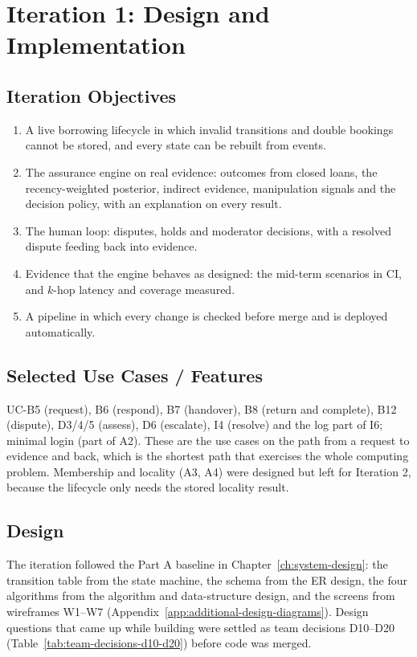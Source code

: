 \chapter{Iteration 1: Design and Implementation}\label{ch:iteration-1-design}
\section{Iteration Objectives}\label{sec:iteration-objectives}
\begin{enumerate}
\item A live borrowing lifecycle in which invalid transitions and double bookings cannot be stored, and every state can be rebuilt from events.
\item The assurance engine on real evidence: outcomes from closed loans, the recency-weighted posterior, indirect evidence, manipulation signals and the decision policy, with an explanation on every result.
\item The human loop: disputes, holds and moderator decisions, with a resolved dispute feeding back into evidence.
\item Evidence that the engine behaves as designed: the mid-term scenarios in CI, and $k$-hop latency and coverage measured.
\item A pipeline in which every change is checked before merge and  is deployed automatically.
\end{enumerate}

\section{Selected Use Cases / Features}\label{sec:selected-use-cases-features}
UC-B5 (request), B6 (respond), B7 (handover), B8 (return and complete), B12 (dispute), D3/4/5 (assess), D6 (escalate), I4 (resolve) and the log part of I6; minimal login (part of A2). These are the use cases on the path from a request to evidence and back, which is the shortest path that exercises the whole computing problem. Membership and locality (A3, A4) were designed but left for Iteration 2, because the lifecycle only needs the stored locality result.

\section{Design}\label{sec:design}
The iteration followed the Part A baseline in Chapter~\ref{ch:system-design}: the transition table from the state machine, the schema from the ER design, the four algorithms from the algorithm and data-structure design, and the screens from wireframes W1--W7 (Appendix~\ref{app:additional-design-diagrams}). Design questions that came up while building were settled as team decisions D10--D20 (Table~\ref{tab:team-decisions-d10-d20}) before code was merged.

